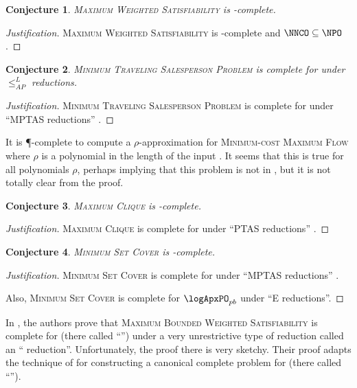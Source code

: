 \documentclass[]{article}
\theoremstyle{plain}
\newtheorem{conjecture}{Conjecture}
\theoremstyle{definition}
\newenvironment{justification}{\begin{proof}[Justification]}{\end{proof}}
\newcommand{\APr}{\leq_{AP}^{L}}
\begin{document}
\begin{conjecture}
  \textsc{Maximum Weighted Satisfiability} is \NNCO-complete.
\end{conjecture}
\begin{justification}
  \textsc{Maximum Weighted Satisfiability} is \NPO-complete \cite{ckst95} and $\NNCO\subseteq\NPO$.
\end{justification}

\begin{conjecture}
  \textsc{Minimum Traveling Salesperson Problem} is complete for \expApxNCO{} under $\APr$ reductions.
\end{conjecture}
\begin{justification}
  \textsc{Minimum Traveling Salesperson Problem} is complete for \expApxPO{} under ``MPTAS reductions'' \cite[Corollary~1]{ep06}.
\end{justification}

It is \P-complete to compute a $\rho$-approximation for \textsc{Minimum-cost Maximum Flow} where $\rho$ is a polynomial in the length of the input \cite{sw92}.
It seems that this is true for all polynomials $\rho$, perhaps implying that this problem is not in \polyApxNCO{}, but it is not totally clear from the proof.

\begin{conjecture}
  \textsc{Maximum Clique} is \polyApxNCO-complete.
\end{conjecture}
\begin{justification}
  \textsc{Maximum Clique} is complete for \polyApxPO{} under ``PTAS reductions'' \cite[Example~2.48]{cks01} \cite{kmsv99} \cite{ep10}.
\end{justification}

\begin{conjecture}
  \textsc{Minimum Set Cover} is \logApxNCO-complete.
\end{conjecture}
\begin{justification}
  \textsc{Minimum Set Cover} is complete for \logApxPO{} under ``MPTAS reductions'' \cite[Example~2.48]{cks01} \cite[Theorem~5]{ep06} \cite[Theorem~27]{ep10}.

  Also, \textsc{Minimum Set Cover} is complete for $\logApxPO_{pb}$ under ``E reductions''.
\end{justification}

In \cite{sx95}, the authors prove that \textsc{Maximum Bounded Weighted Satisfiability} is complete for \ApxNCO{} (there called ``\NCX'') under a very unrestrictive type of reduction called an ``\NCAS{} reduction''.
Unfortunately, the proof there is very sketchy.
Their proof adapts the technique of \cite{cp91} for constructing a canonical complete problem for \ApxPO{} (there called ``\APX'').
\end{document}
